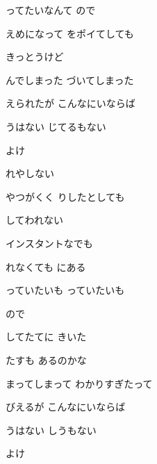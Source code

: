 \documentclass[a4paper,tate,twocolumn,12pt]{ltjtarticle}
\begin{document}
\begin{flushleft}
\vspace{2em}

\noindent\begin{minipage}{\linewidth}
ってたいなんて  ので

えめになって をポイてしても

きっとうけど

んでしまった づいてしまった

えられたが こんなにいならば

うはない じてるもない

よけ
\end{minipage}

\vspace{2em}

\noindent\begin{minipage}{\linewidth}
れやしない

やつがくく りしたとしても

してわれない

インスタントなでも

れなくても にある
\end{minipage}

\vspace{2em}

\noindent\begin{minipage}{\linewidth}
っていたいも っていたいも

ので

してたてに きいた

たすも あるのかな
\end{minipage}

\vspace{2em}

\noindent\begin{minipage}{\linewidth}
まってしまって わかりすぎたって

びえるが こんなにいならば

うはない しうもない

よけ
\end{minipage}

\end{flushleft}
\end{document}
